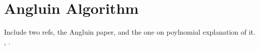 \section{Angluin Algorithm}

Include two refs, the Angluin paper, and the one on poylnomial explanation of
it. \cite{Angluin1992}, \cite{PolyAngluin}.